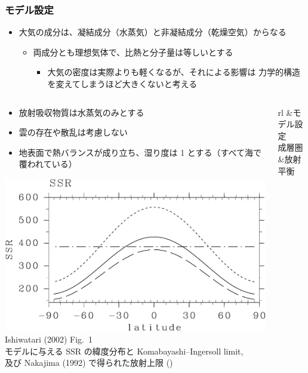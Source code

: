 \documentclass[aspectratio=149,9pt,]{beamer}
\begin{document}
\begin{frame}
	\frametitle{モデル設定}
	\begin{itemize}
		\item 大気の成分は、凝結成分（水蒸気）と非凝結成分（乾燥空気）からなる
			\begin{itemize}
				\item 両成分とも理想気体で、比熱と分子量は等しいとする
					\begin{itemize}
						\item 大気の密度は実際よりも軽くなるが、それによる影響は
							力学的構造を変えてしまうほど大きくないと考える
					\end{itemize}
			\end{itemize}
	\end{itemize}
	\begin{columns}[T,onlytextwidth]
		\begin{column}{.5\textwidth}
			\begin{itemize}
				\item 放射吸収物質は水蒸気のみとする
				\item 雲の存在や散乱は考慮しない
				\item 地表面で熱バランスが成り立ち、湿り度は 1 とする（すべて海で覆われている）
			\end{itemize}
			\begin{center}
				\scriptsize
				\includegraphics[width=.6\textwidth]{./fig/SSR.kps-crop.pdf}\\
				Ishiwatari \etal (2002) Fig.~1\\
				モデルに与える SSR の緯度分布と Komabayashi--Ingersoll limit,\\
				及び Nakajima \etal (1992) で得られた放射上限 ()
			\end{center}
		\end{column}
		\begin{column}{.45\textwidth}
			\tiny\centering
			\begin{tblr}{rl}
				\hline
				&モデル設定\\
				\hline
				成層圏&放射平衡\\

\end{tblr}
\end{column}
\end{columns}
\end{frame}
\end{document}
